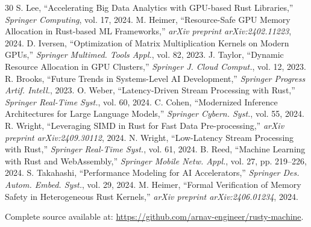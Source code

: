 \documentclass[conference]{IEEEtran}
\begin{document}
\begin{thebibliography}{30}
 S. Lee, ``Accelerating Big Data Analytics with GPU-based Rust Libraries,'' \textit{Springer Computing}, vol. 17, 2024.
 M. Heimer, ``Resource-Safe GPU Memory Allocation in Rust-based ML Frameworks,'' \textit{arXiv preprint arXiv:2402.11223}, 2024.
 D. Iversen, ``Optimization of Matrix Multiplication Kernels on Modern GPUs,'' \textit{Springer Multimed. Tools Appl.}, vol. 82, 2023.
 J. Taylor, ``Dynamic Resource Allocation in GPU Clusters,'' \textit{Springer J. Cloud Comput.}, vol. 12, 2023.
 R. Brooks, ``Future Trends in Systems-Level AI Development,'' \textit{Springer Progress Artif. Intell.}, 2023.
 O. Weber, ``Latency-Driven Stream Processing with Rust,'' \textit{Springer Real-Time Syst.}, vol. 60, 2024.
 C. Cohen, ``Modernized Inference Architectures for Large Language Models,'' \textit{Springer Cybern. Syst.}, vol. 55, 2024.
 R. Wright, ``Leveraging SIMD in Rust for Fast Data Pre-processing,'' \textit{arXiv preprint arXiv:2409.30112}, 2024.
 N. Wright, ``Low-Latency Stream Processing with Rust,'' \textit{Springer Real-Time Syst.}, vol. 61, 2024.
 B. Reed, ``Machine Learning with Rust and WebAssembly,'' \textit{Springer Mobile Netw. Appl.}, vol. 27, pp. 219--226, 2024.
 S. Takahashi, ``Performance Modeling for AI Accelerators,'' \textit{Springer Des. Autom. Embed. Syst.}, vol. 29, 2024.
 M. Heimer, ``Formal Verification of Memory Safety in Heterogeneous Rust Kernels,'' \textit{arXiv preprint arXiv:2406.01234}, 2024.

\end{thebibliography}

\bigskip
\noindent Complete source available at: \url{https://github.com/arnav-engineer/rusty-machine}.
\end{document}
